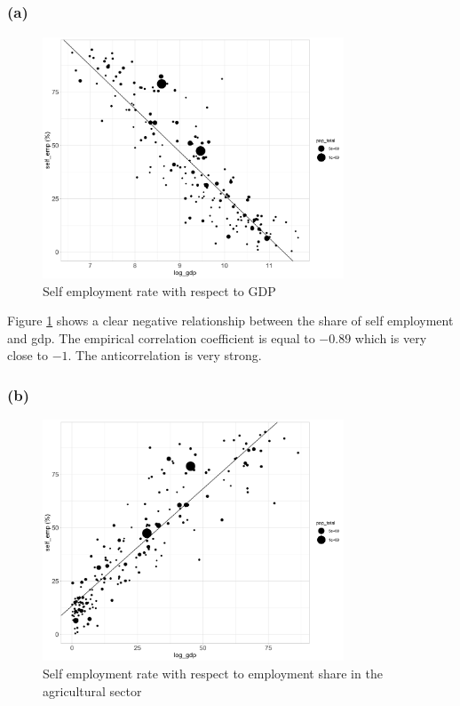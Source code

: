 \subsection{}


\subsection{}
\subsubsection*{(a)}


\begin{figure}[H]
  \centering
  \includegraphics[width=0.8\textwidth]{Exercise_1/OUTPUT/emp_wrt_gdp.png}
  \caption{Self employment rate with respect to GDP}
  \label{fig:emp_gdp}
\end{figure}


Figure \ref{fig:emp_gdp} shows a clear negative relationship between the share of self employment and gdp. The empirical correlation coefficient is equal to $-0.89$
which is very close to $-1$. The anticorrelation is very strong.
\subsubsection*{(b)}

\begin{figure}[H]
  \centering
  \includegraphics[width=0.8\textwidth]{Exercise_1/OUTPUT/emp_wrt_agro.png}
  \caption{Self employment rate with respect to employment share in the agricultural sector}
  \label{fig:emp_agro}
\end{figure}

